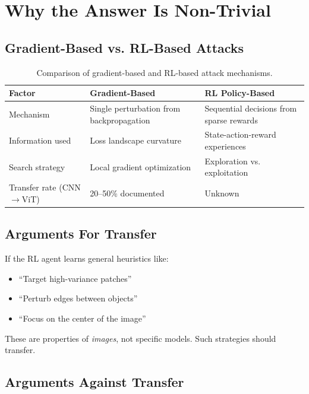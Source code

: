 \documentclass[11pt,a4paper]{article}
\begin{document}
\section{Why the Answer Is Non-Trivial}

\subsection{Gradient-Based vs. RL-Based Attacks}

\begin{table}[H]
\centering
\begin{tabular}{@{}lp{5cm}p{5cm}@{}}
\toprule
\textbf{Factor} & \textbf{Gradient-Based} & \textbf{RL Policy-Based} \\
\midrule
Mechanism & Single perturbation from backpropagation & Sequential decisions from sparse rewards \\
Information used & Loss landscape curvature & State-action-reward experiences \\
Search strategy & Local gradient optimization & Exploration vs. exploitation \\
Transfer rate (CNN$\to$ViT) & 20--50\% documented & Unknown \\
\bottomrule
\end{tabular}
\caption{Comparison of gradient-based and RL-based attack mechanisms.}
\end{table}

\subsection{Arguments For Transfer}

If the RL agent learns general heuristics like:
\begin{itemize}
    \item ``Target high-variance patches''
    \item ``Perturb edges between objects''
    \item ``Focus on the center of the image''
\end{itemize}

These are properties of \textit{images}, not specific models. Such strategies should transfer.

\subsection{Arguments Against Transfer}
\end{document}
